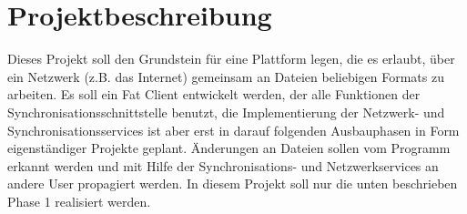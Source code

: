 
\section{Projektbeschreibung}

Dieses Projekt soll den Grundstein für eine Plattform legen, die es erlaubt, über ein Netzwerk (z.B. das Internet) gemeinsam an Dateien beliebigen Formats zu arbeiten. Es soll ein Fat Client entwickelt werden, der alle Funktionen der Synchronisationsschnittstelle benutzt, die Implementierung der Netzwerk- und Synchronisationsservices ist aber erst in darauf folgenden Ausbauphasen in Form eigenständiger Projekte geplant. Änderungen an Dateien sollen vom Programm erkannt werden und mit Hilfe der Synchronisations- und Netzwerkservices an andere User propagiert werden. In diesem Projekt soll nur die unten beschrieben Phase 1 realisiert werden.
